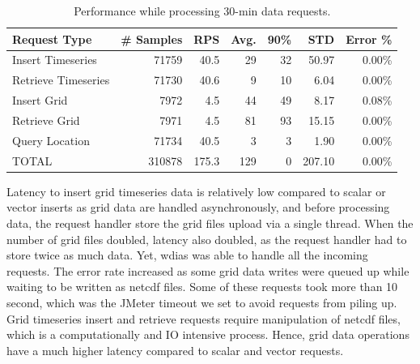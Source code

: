 \documentclass[conference]{IEEEtran}
\begin{document}
\begin{table}[tb!]
\caption{Performance while processing 30-min data requests.}
\begin{center}
\begin{adjustbox}{width=0.45\textwidth}
\begin{tabular}{|l|r|r|r|r|r|r|}
\hline
\textbf{Request Type} & \textbf{\# Samples} & \textbf{RPS} & \textbf{Avg.} & \textbf{90\%} & \textbf{STD} & \textbf{Error \%} \\ \hline
Insert Timeseries & 71759 & 40.5 & 29 & 32 & 50.97 & 0.00\% \\ \hline
Retrieve Timeseries & 71730 & 40.6 & 9 & 10 & 6.04 & 0.00\% \\ \hline
Insert Grid & 7972 & 4.5 & 44 & 49 & 8.17 & 0.08\% \\ \hline
Retrieve Grid & 7971 & 4.5 & 81 & 93 & 15.15 & 0.00\% \\ \hline
Query Location & 71734 & 40.5 & 3 & 3 & 1.90 & 0.00\% \\ \hline
TOTAL & 310878 & 175.3 & 129 & 0 & 207.10 & 0.00\% \\ \hline
\end{tabular}
\end{adjustbox}
\label{ptab:obs_all_30_min_summary_throughput}
\end{center}
\end{table}

Latency to insert grid timeseries data is relatively low compared to scalar or vector inserts as grid data are handled asynchronously, and before processing data, the request handler store the grid files upload via a single thread. When the number of grid files doubled, latency also doubled, as the request handler had to store twice as much data. Yet, \acrshort{wdias} was able to handle all the incoming requests. The error rate increased as some grid data writes were queued up while waiting to be written as \acrshort{netcdf} files. Some of these requests took more than 10 second, which was the JMeter timeout we set to avoid requests from piling up. Grid timeseries insert and retrieve requests require manipulation of \acrshort{netcdf} files, which is a computationally and IO intensive process. Hence, grid data operations have a much higher latency compared to scalar and vector requests.
\end{document}
